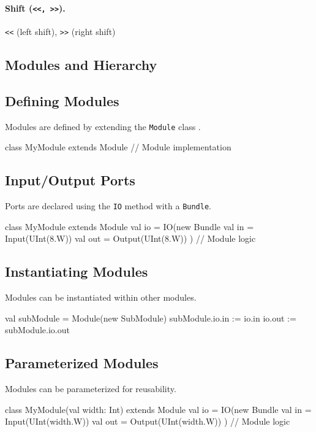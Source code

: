 \paragraph{Shift (\texttt{<<, >>}).} \texttt{<<} (left shift), \texttt{>>} (right shift)

\subsection{Modules and Hierarchy}
\subsection{Defining Modules}
Modules are defined by extending the \texttt{Module} class \cite{chisel-doc}.

\begin{chiselcode}
class MyModule extends Module {
  // Module implementation
}    
\end{chiselcode}

\subsection{Input/Output Ports}
Ports are declared using the \texttt{IO} method with a \texttt{Bundle}.
\begin{chiselcode}
class MyModule extends Module {
  val io = IO(new Bundle {
    val in  = Input(UInt(8.W))
    val out = Output(UInt(8.W))
  })
  // Module logic
}    
\end{chiselcode}

\subsection{Instantiating Modules}
Modules can be instantiated within other modules.
\begin{chiselcode}
val subModule = Module(new SubModule)
subModule.io.in := io.in
io.out := subModule.io.out
\end{chiselcode}

\subsection{Parameterized Modules}
Modules can be parameterized for reusability.
\begin{chiselcode}
class MyModule(val width: Int) extends Module {
  val io = IO(new Bundle {
    val in  = Input(UInt(width.W))
    val out = Output(UInt(width.W))
  })
  // Module logic
}    
\end{chiselcode}


